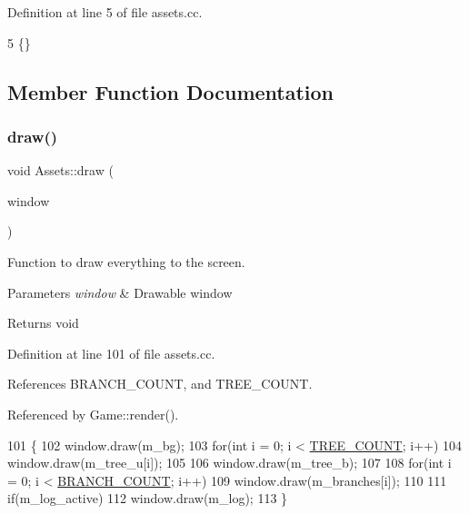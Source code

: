 Definition at line 5 of file assets.\+cc.


\begin{DoxyCode}
5 \{\}
\end{DoxyCode}


\subsection{Member Function Documentation}
\mbox{\label{class_assets_a22a160044158884eefe4bc93677c0211}} 
\subsubsection{\texorpdfstring{draw()}{draw()}}
{\footnotesize\ttfamily void Assets\+::draw (\begin{DoxyParamCaption}\item[{sf\+::\+Render\+Window \&}]{window }\end{DoxyParamCaption})}



Function to draw everything to the screen. 


\begin{DoxyParams}{Parameters}
{\em window} & Drawable window \\
\hline
\end{DoxyParams}
\begin{DoxyReturn}{Returns}
void 
\end{DoxyReturn}


Definition at line 101 of file assets.\+cc.



References B\+R\+A\+N\+C\+H\+\_\+\+C\+O\+U\+NT, and T\+R\+E\+E\+\_\+\+C\+O\+U\+NT.



Referenced by Game\+::render().


\begin{DoxyCode}
101                                         \{
102     window.draw(m\_bg);
103     \textcolor{keywordflow}{for}(\textcolor{keywordtype}{int} i = 0; i < \hyperlink{assets_8h_af9e38b40ed77ca3acf11736e89974fb1}{TREE\_COUNT}; i++)   
104         window.draw(m\_tree\_u[i]);
105     
106     window.draw(m\_tree\_b);
107 
108     \textcolor{keywordflow}{for}(\textcolor{keywordtype}{int} i = 0; i < \hyperlink{assets_8h_a21bfb121481880074762e53e6ecef7c0}{BRANCH\_COUNT}; i++)
109         window.draw(m\_branches[i]);
110     
111     \textcolor{keywordflow}{if}(m\_log\_active)
112         window.draw(m\_log);
113 \}
\end{DoxyCode}
\mbox{\label{class_assets_aac229701c6bc1d67c56a1e607658d923}} 
